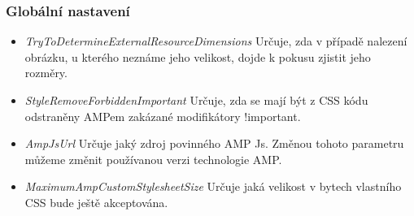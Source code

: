 \subsubsection{Globální nastavení}
\begin{itemize}
    \item \textit{TryToDetermineExternalResourceDimensions} \newline
    Určuje, zda v případě nalezení obrázku, u kterého neznáme jeho velikost, dojde k pokusu zjistit jeho rozměry.
    \item \textit{StyleRemoveForbiddenImportant}\newline
    Určuje, zda se mají být z CSS kódu odstraněny AMPem zakázané modifikátory !important.
    \item \textit{AmpJsUrl}\newline
    Určuje jaký zdroj povinného AMP Js. Změnou tohoto parametru můžeme změnit používanou verzi technologie AMP.
    \item \textit{MaximumAmpCustomStylesheetSize}\newline
    Určuje jaká velikost v bytech vlastního CSS bude ještě akceptována.
\end{itemize}


